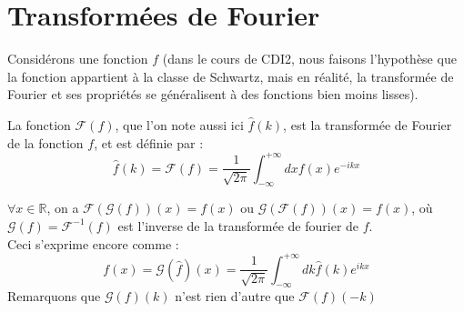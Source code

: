 \documentclass[../notesdecours.tex]{subfiles}
\begin{document}
\section{Transformées de Fourier}

Considérons une fonction $f$ (dans le cours de CDI2, nous faisons l'hypothèse que la fonction 
appartient à la classe de Schwartz, mais en réalité, la transformée de Fourier et ses propriétés se généralisent 
à des fonctions bien moins lisses). \\

\begin{definition}
    La fonction  $\mathcal{F}(f)$, que l'on note aussi ici $\hat{f}(k)$, est la transformée 
    de Fourier de la fonction $f$, et est définie par : 
\begin{equation}
\hat{f}(k) = \mathcal{F}(f) = \frac{1}{\sqrt{2 \pi}} \int_{-\infty}^{+\infty} dx f(x) e^{-ikx}
\end{equation}
\end{definition}

\begin{theorem} 
    $\forall x \in \mathbb{R}$, on a $\mathcal{F}(\mathcal{G}(f))(x) = f(x)$ ou $\mathcal{G}(\mathcal{F}(f))(x) = f(x)$, 
    où $\mathcal{G}(f) = \mathcal{F}^{-1}(f)$ est l'inverse de la transformée de fourier de $f$. \\
    Ceci s'exprime encore comme : 
    \begin{equation}
        f(x) = \mathcal{G}(\hat{f})(x) = \frac{1}{\sqrt{2 \pi}} \int_{-\infty}^{+\infty} dk\hat{f}(k) e^{ikx}
    \end{equation}
Remarquons que $\mathcal{G}(f)(k)$ n'est rien d'autre que $\mathcal{F}(f)(-k)$
\end{theorem}
\end{document}
